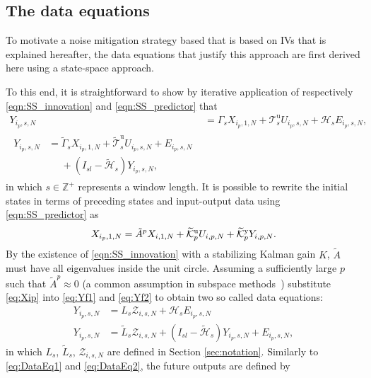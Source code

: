\subsection{The data equations}
To motivate a noise mitigation strategy based that is based on \ac{IVs} that is explained hereafter, the data equations that justify this approach are first derived here using a state-space approach.

To this end, it is straightforward to show by iterative application of respectively \eqref{eqn:SS_innovation} and \eqref{eqn:SS_predictor} that%
\begin{align}
    Y_{i_p,s,N} &= \Gamma_s X_{i_p,1,N} + \mathcal{T}_s^\mathrm{u} U_{i_p,s,N} + \mathcal{H}_s E_{i_p,s,N}\label{eq:Yf1},\\
    \begin{split}%
    Y_{i_p,s,N} &= \widetilde{\Gamma}_s X_{i_p,1,N} + \widetilde{\mathcal{T}}_s^\mathrm{u} U_{i_p,s,N} + E_{i_p,s,N}\\
    &\phantom{=}+(I_{sl}-\widetilde{\mathcal{H}}_s)Y_{i_p,s,N},
    \end{split}\label{eq:Yf2}
\end{align}
in which $s\in\mathbb{Z}^+$ represents a window length. It is possible to rewrite the initial states in terms of preceding states and input-output data using \eqref{eqn:SS_predictor} as%
\begin{align}\label{eq:Xip}
    X_{i_p,1,N} = \tilde{A}^p X_{i,1,N} + \widetilde{\mathcal{K}}_{p}^{\mathrm{{u}}} U_{i,p,N} + \widetilde{\mathcal{K}}_{p}^{\mathrm{{y}}} Y_{i,p,N}.
\end{align}
By the existence of \eqref{eqn:SS_innovation} with a stabilizing Kalman gain $K$, $\tilde{A}$ must have all eigenvalues inside the unit circle. Assuming a sufficiently large $p$ such that $\tilde{A}^p\approx 0$ (a common assumption in subspace methods~\cite{Chiuso2007}) substitute \eqref{eq:Xip} into \eqref{eq:Yf1} and \eqref{eq:Yf2} to obtain two so called data equations:
\begin{align}
    Y_{i_p,s,N} &= L_s \mathcal{Z}_{i,s,N} + \mathcal{H}_s E_{i_p,s,N}\label{eq:DataEq1}\\
    Y_{i_p,s,N} &= \widetilde{L}_s \mathcal{Z}_{i,s,N} + (I_{sl}-\widetilde{\mathcal{H}}_s) Y_{i_p,s,N} + E_{i_p,s,N},\label{eq:DataEq2}
\end{align}
in which $L_s$, $\widetilde{L}_s$, $\mathcal{Z}_{i,s,N}$ are defined in Section \ref{sec:notation}. Similarly to \eqref{eq:DataEq1} and \eqref{eq:DataEq2}, the future outputs are defined by
